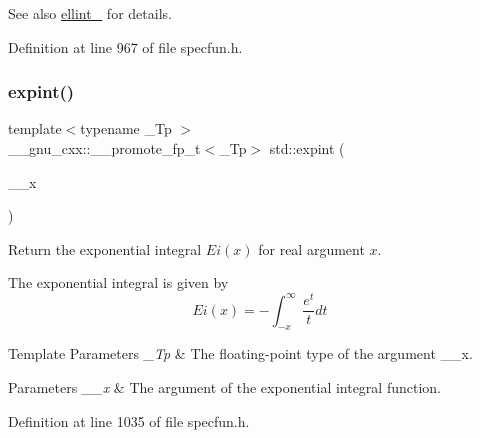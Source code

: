 \begin{DoxySeeAlso}{See also}
\hyperlink{group__tr29124__math__spec__func_ga3af251108b5384ca1f27350e47c8108e}{ellint\+\_} for details. 
\end{DoxySeeAlso}


Definition at line 967 of file specfun.\+h.

\mbox{\label{group__tr29124__math__spec__func_gac6d12da409bbd0e41dd1f7cdb3317252}} 
\subsubsection{\texorpdfstring{expint()}{expint()}}
{\footnotesize\ttfamily template$<$typename \+\_\+\+Tp $>$ \\
\+\_\+\+\_\+gnu\+\_\+cxx\+::\+\_\+\+\_\+promote\+\_\+fp\+\_\+t$<$\+\_\+\+Tp$>$ std\+::expint (\begin{DoxyParamCaption}\item[{\+\_\+\+Tp}]{\+\_\+\+\_\+x }\end{DoxyParamCaption})\hspace{0.3cm}{\ttfamily [inline]}}

Return the exponential integral $ Ei(x) $ for {\ttfamily real} argument $ x $.

The exponential integral is given by \[ Ei(x) = -\int_{-x}^\infty \frac{e^t}{t} dt \]


\begin{DoxyTemplParams}{Template Parameters}
{\em \+\_\+\+Tp} & The floating-\/point type of the argument {\ttfamily \+\_\+\+\_\+x}. \\
\hline
\end{DoxyTemplParams}

\begin{DoxyParams}{Parameters}
{\em \+\_\+\+\_\+x} & The argument of the exponential integral function. \\
\hline
\end{DoxyParams}


Definition at line 1035 of file specfun.\+h.

\mbox{\label{group__tr29124__math__spec__func_ga5842816f6eed2594e0a327df4e4a2a47}} 
